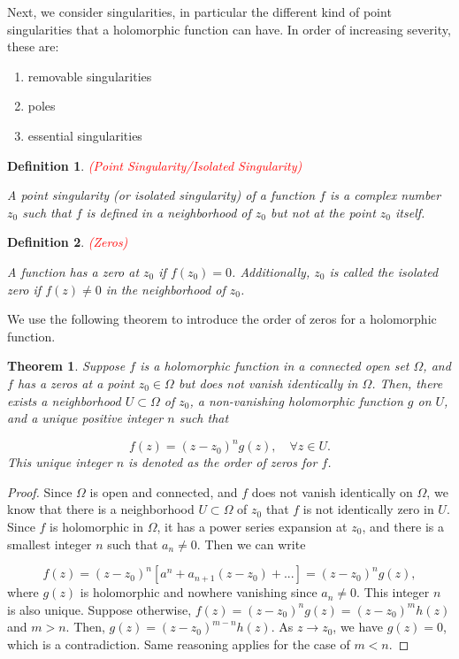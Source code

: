 \documentclass{article}
\newtheorem{definition}{Definition}
\newtheorem{theorem}{Theorem}
\begin{document}
Next, we consider singularities, in particular the different kind of point singularities that a holomorphic function can have. In order of increasing severity, these are:

\begin{enumerate}
\item
removable singularities

\item
poles

\item
essential singularities
\end{enumerate}

\begin{definition}\textcolor{red}{(Point Singularity/Isolated Singularity)}

A point singularity (or isolated singularity) of a function $f$ is a complex number $z_0$ such that $f$ is defined in a neighborhood of $z_0$ but not at the point $z_0$ itself.
\end{definition}

\begin{definition} \textcolor{red}{(Zeros)}

A function has a zero at $z_0$ if $f(z_0)=0$. Additionally, $z_0$ is called the isolated zero if $f(z)\neq0$ in the neighborhood of $z_0$.
\end{definition}

We use the following theorem to introduce the order of zeros for a holomorphic function. 

\begin{theorem} \label{thm:zero}
Suppose $f$ is a holomorphic function in a connected open set $\Omega$, and $f$ has a zeros at  a point $z_0\in\Omega$ but does not vanish identically in $\Omega$. Then, there exists a neighborhood $U\subset\Omega$ of $z_0$, a non-vanishing holomorphic function $g$ on $U$, and a unique positive integer $n$ such that 

\begin{equation}
f(z)=(z-z_0)^ng(z), \quad \forall z\in U.
\end{equation}
This unique integer $n$ is denoted as the order of zeros for $f$.
\end{theorem}

\begin{proof}
Since $\Omega$ is open and connected, and $f$ does not vanish identically on $\Omega$, we know that there is a neighborhood $U\subset\Omega$ of $z_0$ that $f$ is not identically zero in $U$. Since $f$ is holomorphic in $\Omega$, it has a power series expansion at $z_0$, and there is a smallest integer $n$ such that $a_n\neq0$. Then we can write

\begin{equation*}
f(z)=(z-z_0)^n[a^n+a_{n+1}(z-z_0)+...]=(z-z_0)^ng(z),
\end{equation*}
where $g(z)$ is holomorphic and nowhere vanishing since $a_n\neq0$. This integer $n$ is also unique. Suppose otherwise, $f(z)=(z-z_0)^ng(z)=(z-z_0)^mh(z)$ and $m>n$. Then, $g(z)=(z-z_0)^{m-n}h(z)$. As $z\rightarrow z_0$, we have $g(z)=0$, which is a contradiction. Same reasoning applies for the case of $m<n$.
\end{proof}
\end{document}
